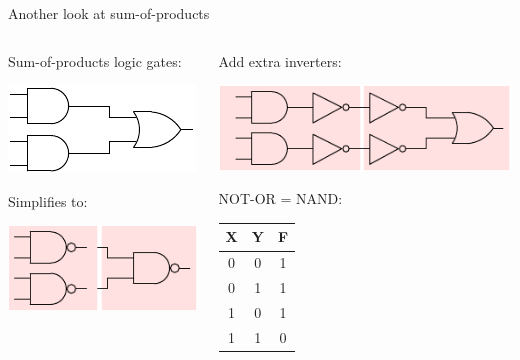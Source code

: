\begin{frame}{Another look at sum-of-products}
  \begin{columns}
    \begin{column}[t]{5cm}
      Sum-of-products logic gates: \\
      \begin{center}
        \includegraphics{ANDOR}
      \end{center}
      Simplifies to: \\
      \begin{center}
        \includegraphics{NANDNAND}
      \end{center}
    \end{column}
    \begin{column}[t]{5cm}
      Add extra inverters: \\
      \begin{center}
        \includegraphics{ANDNOTNOTOR}
      \end{center}
      NOT-OR = NAND: \\
      \begin{center}
        \begin{tabular}{ccc}
          \textbf{X} & \textbf{Y} & \textbf{F} \\
          \hline
          0 & 0 & 1 \\
          0 & 1 & 1 \\
          1 & 0 & 1 \\
          1 & 1 & 0 \\
        \end{tabular}
      \end{center}
    \end{column}
  \end{columns}
\end{frame}


